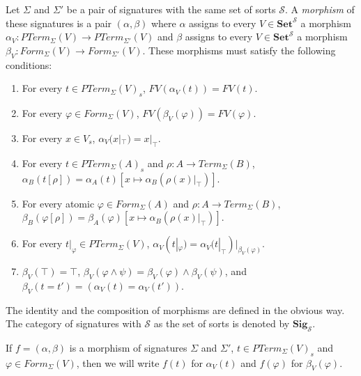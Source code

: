 \documentclass[reqno]{amsart}
\theoremstyle{definition}
\theoremstyle{remark}
\newcommand{\cat}[1]{\mathbf{#1}}
\newcommand{\Set}{\cat{Set}}
\newcommand{\Sig}{\cat{Sig}}
\numberwithin{figure}{section}
\begin{document}
\begin{defn}
Let $\Sigma$ and $\Sigma'$ be a pair of signatures with the same set of sorts $\mathcal{S}$.
A \emph{morphism} of these signatures is a pair $(\alpha,\beta)$ where $\alpha$ assigns to every $V \in \Set^\mathcal{S}$ a morphism $\alpha_V : PTerm_\Sigma(V) \to PTerm_{\Sigma'}(V)$
and $\beta$ assigns to every $V \in \Set^\mathcal{S}$ a morphism $\beta_V : Form_\Sigma(V) \to Form_{\Sigma'}(V)$.
These morphisms must satisfy the following conditions:
\begin{enumerate}
\item For every $t \in PTerm_\Sigma(V)_s$, $FV(\alpha_V(t)) = FV(t)$.
\label{mor-sig-a-fv}
\item For every $\varphi \in Form_\Sigma(V)$, $FV(\beta_V(\varphi)) = FV(\varphi)$.
\label{mor-sig-b-fv}
\item For every $x \in V_s$, $\alpha_V(x|_\top) = x|_\top$.
\label{mor-sig-a-var}
\item For every $t \in PTerm_\Sigma(A)_s$ and $\rho : A \to Term_\Sigma(B)$, $\alpha_B(t[\rho]) = \alpha_A(t)[x \mapsto \alpha_B(\rho(x)|_\top)]$.
\label{mor-sig-a-subst}
\item For every atomic $\varphi \in Form_\Sigma(A)$ and $\rho : A \to Term_\Sigma(B)$, $\beta_B(\varphi[\rho]) = \beta_A(\varphi)[x \mapsto \alpha_B(\rho(x)|_\top)]$.
\label{mor-sig-b-subst}
\item For every $t|_\varphi \in PTerm_\Sigma(V)$, $\alpha_V(t|_\varphi) = \alpha_V(t|_\top)|_{\beta_V(\varphi)}$.
\label{mor-sig-a-op}
\item $\beta_V(\top) = \top$, $\beta_V(\varphi \land \psi) = \beta_V(\varphi) \land \beta_V(\psi)$, and $\beta_V(t = t') = (\alpha_V(t) = \alpha_V(t'))$.
\label{mor-sig-b-op}
\end{enumerate}
The identity and the composition of morphisms are defined in the obvious way.
The category of signatures with $\mathcal{S}$ as the set of sorts is denoted by $\Sig_\mathcal{S}$.
\end{defn}

If $f = (\alpha,\beta)$ is a morphism of signatures $\Sigma$ and $\Sigma'$, $t \in PTerm_\Sigma(V)_s$ and $\varphi \in Form_\Sigma(V)$,
then we will write $f(t)$ for $\alpha_V(t)$ and $f(\varphi)$ for $\beta_V(\varphi)$.
\end{document}
